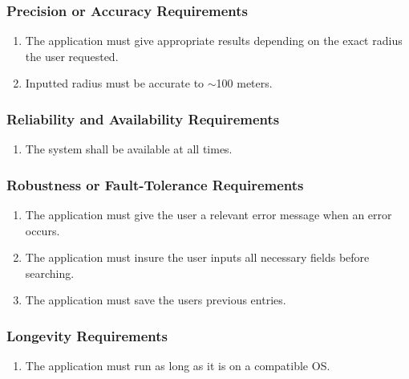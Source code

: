 \documentclass[english]{article}
\begin{document}
\subsubsection{Precision or Accuracy Requirements}
\label{ssub:precision_or_accuracy_requirements}
\begin{enumerate}[{PAR}1. ]
\item The application must give appropriate results depending on the exact radius the user requested.

\item Inputted radius must be accurate to $\sim$100 meters.
\end{enumerate}

\subsubsection{Reliability and Availability Requirements}
\label{ssub:reliability_and_availability_requirements}
\begin{enumerate}[{RAR}1. ]
\item The system shall be available at all times.
\end{enumerate}

\subsubsection{Robustness or Fault-Tolerance Requirements}
\label{ssub:robustness_or_fault_tolerance_requirements}
\begin{enumerate}[{RFR}1. ]
\item The application must give the user a relevant error message when an error occurs.

\item The application must insure the user inputs all necessary fields before searching.

\item The application must save the users previous entries.

\end{enumerate}

\subsubsection{Longevity Requirements}
\label{ssub:longevity_requirements}
\begin{enumerate}[{LONGR}1. ]
\item The application must run as long as it is on a compatible OS.
\end{enumerate}
\end{document}

